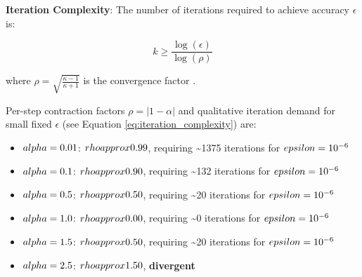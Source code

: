 \documentclass[
]{article}
\providecommand{\tightlist}{%
  \setlength{\itemsep}{0pt}\setlength{\parskip}{0pt}}
\begin{document}
\textbf{Iteration Complexity}: The number of iterations required to
achieve accuracy \(\epsilon\) is:

\begin{equation}
\label{eq:iteration_complexity}
k \geq \frac{\log(\epsilon)}{\log(\rho)}
\end{equation}

where \(\rho = \sqrt{\frac{\kappa - 1}{\kappa + 1}}\) is the convergence
factor \cite{polyak1964some}.

Per-step contraction factors \(\rho = |1-\alpha|\) and qualitative
iteration demand for small fixed \(\epsilon\) (see Equation
\ref{eq:iteration_complexity}) are:

\begin{itemize}
\tightlist
\item
  \(\\alpha = 0.01\): \(\\rho \\approx 0.99\), requiring
  \textasciitilde1375 iterations for \(\\epsilon = 10^{-6}\)
\item
  \(\\alpha = 0.1\): \(\\rho \\approx 0.90\), requiring
  \textasciitilde132 iterations for \(\\epsilon = 10^{-6}\)
\item
  \(\\alpha = 0.5\): \(\\rho \\approx 0.50\), requiring
  \textasciitilde20 iterations for \(\\epsilon = 10^{-6}\)
\item
  \(\\alpha = 1.0\): \(\\rho \\approx 0.00\), requiring \textasciitilde0
  iterations for \(\\epsilon = 10^{-6}\)
\item
  \(\\alpha = 1.5\): \(\\rho \\approx 0.50\), requiring
  \textasciitilde20 iterations for \(\\epsilon = 10^{-6}\)
\item
  \(\\alpha = 2.5\): \(\\rho \\approx 1.50\), \textbf{divergent}
\end{itemize}
\end{document}
